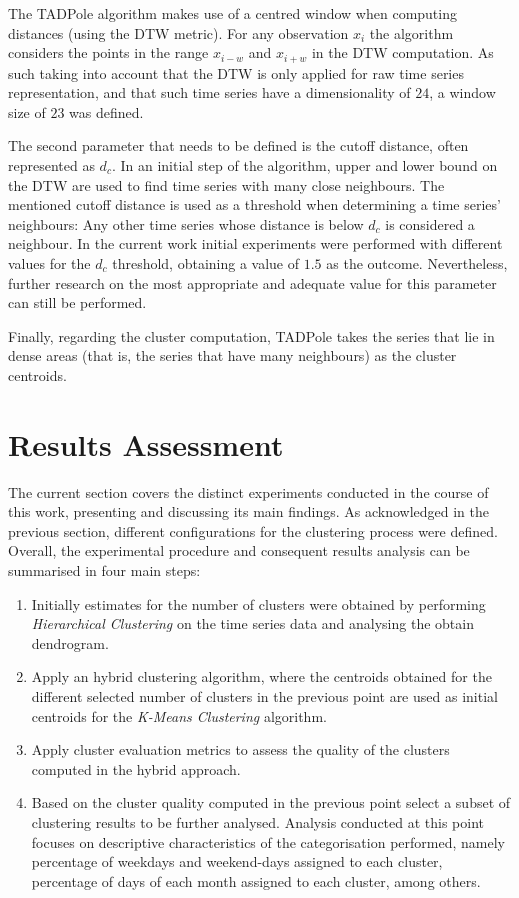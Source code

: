 \documentclass[9pt,journal,compsoc]{IEEEtran}
\begin{document}
The TADPole algorithm makes use of a centred window when computing distances (using the DTW metric). For any observation $x_{i}$ the algorithm considers the points in the range $x_{i-w}$ and $x_{i+w}$ in the DTW computation. As such taking into account that the DTW is only applied for raw time series representation, and that such time series have a dimensionality of $24$, a window size of $23$ was defined.

The second parameter that needs to be defined is the cutoff distance, often represented as $d_{c}$. In an initial step of the algorithm, upper and lower bound on the DTW are used to find time series with many close neighbours. The mentioned cutoff distance is used as a threshold when determining a time series' neighbours: Any other time series whose distance is below $d_{c}$ is considered a neighbour. In the current work initial experiments were performed with different values for the $d_{c}$ threshold, obtaining a value of $1.5$ as the outcome. Nevertheless, further research on the most appropriate and adequate value for this parameter can still be performed.

Finally, regarding the cluster computation, TADPole takes the series that lie in dense areas (that is, the series that have many neighbours) as the cluster centroids.

\section{Results Assessment}
\label{results_assessment}

The current section covers the distinct experiments conducted in the course of this work, presenting and discussing its main findings. As acknowledged in the previous section, different configurations for the clustering process were defined. Overall, the experimental procedure and consequent results analysis can be summarised in four main steps:

\begin{enumerate}
	\item Initially estimates for the number of clusters were obtained by performing \emph{Hierarchical Clustering} on the time series data and analysing the obtain dendrogram.
	
	\item Apply an hybrid clustering algorithm, where the centroids obtained for the different selected number of clusters in the previous point are used as initial centroids for the \emph{K-Means Clustering} algorithm.
	
	\item Apply cluster evaluation metrics to assess the quality of the clusters computed in the hybrid approach.
	
	\item Based on the cluster quality computed in the previous point select a subset of clustering results to be further analysed. Analysis conducted at this point focuses on descriptive characteristics of the categorisation performed, namely percentage of weekdays and weekend-days assigned to each cluster, percentage of days of each month assigned to each cluster, among others.
\end{enumerate}
\end{document}
